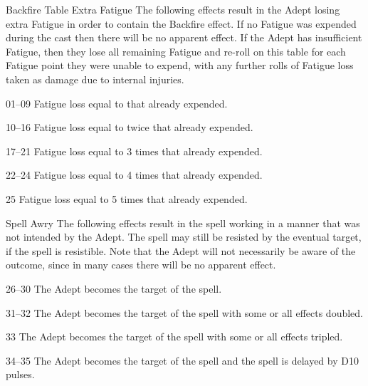 \begin{Chapter}{Backfire Table}
\label{table:backfire}
Extra Fatigue The following effects result in the 
Adept losing extra Fatigue in order to contain the 
Backfire effect. If no Fatigue was expended during 
the cast then there will be no apparent effect. If the 
Adept has insufficient Fatigue, then they lose all 
remaining Fatigue and re-roll on this table for each 
Fatigue point they were unable to expend, with any 
further rolls of Fatigue loss taken as damage due to 
internal injuries. 

\begin{Description}

\item[01--09] Fatigue loss equal to that already expended.

\item[10--16] Fatigue loss equal to twice that already expended.

\item[17--21] Fatigue loss equal to 3 times that already expended.

\item[22--24]   Fatigue loss equal to 4 times that already 
expended. 

\item[25]  Fatigue loss equal to 5 times that already 
expended. 

\end{Description}

Spell Awry The following effects result in the spell working in a
manner that was not intended by the Adept. The spell may still be
resisted by the eventual target, if the spell is resistible. Note that
the Adept will not necessarily be aware of the outcome, since in many
cases there will be no apparent effect.

\begin{Description}

\item[26--30] The Adept becomes the target of the spell.

\item[31--32] The Adept becomes the target of the spell with some or
  all effects doubled.

\item[33] The Adept becomes the target of the spell with some or all
  effects tripled.

\item[34--35] The Adept becomes the target of the spell and the spell
  is delayed by D10 pulses.


\end{Description}
\end{Chapter}
